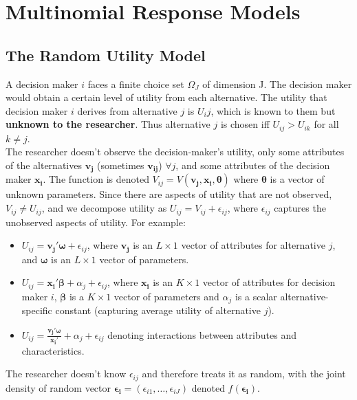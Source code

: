\documentclass[DIV=14,titlepage=false]{scrreprt}
\begin{document}
\vspace{-10pt}
\setcounter{chapter}{2}

\chapter{Multinomial Response Models}

\section{The Random Utility Model}
A decision maker $i$ faces a finite choice set $\Omega_J$ of dimension J. The decision maker would obtain a certain level of utility from each alternative. The utility that decision maker $i$ derives from alternative $j$ is $U_ij$, which is known to them but \textbf{unknown to the researcher}. Thus alternative $j$ is chosen iff $U_{ij} > U_{ik}$ for all $k \neq j$. \\
The researcher doesn't observe the decision-maker's utility, only some attributes of the alternatives $\mathbf{v_j}$ (sometimes $\mathbf{v_{ij}}$) $\forall j$, and some attributes of the decision maker $\mathbf{x_i}$. The function is denoted $V_{ij} = V(\mathbf{v_j},\mathbf{x_i}, \mathbf{\theta})$ where $\mathbf{\theta}$ is a vector of unknown parameters. Since there are aspects of utility that are not observed, $V_{ij} \not = U_{ij}$, and we decompose utility as $U_{ij} = V_{ij} + \epsilon_{ij}$, where $\epsilon_{ij}$ captures the unobserved aspects of utility. For example:
\begin{itemize}
    \item $U_{ij} = \mathbf{v_j'\omega} + \epsilon_{ij}$, where $\mathbf{v_j}$ is an $L\times1$ vector of attributes for alternative $j$, and $\mathbf{\omega}$ is an $L\times1$ vector of parameters.
    \item $U_{ij} = \mathbf{x_i ' \beta} + \alpha_j + \epsilon_{ij}$, where $\mathbf{x_i}$ is an $K\times1$ vector of attributes for decision maker $i$, $\mathbf{\beta}$ is a $K\times1$ vector of parameters and $\alpha_j$ is a scalar alternative-specific constant (capturing average utility of alternative $j$).
    \item $U_{ij} = \frac{\mathbf{v_j'\omega}}{\mathbf{x_i'}} + \alpha_j + \epsilon_{ij}$ denoting interactions between attributes and characteristics.
\end{itemize}
The researcher doesn't know $\epsilon_{ij}$ and therefore treats it as random, with the joint density of random vector $\mathbf{\epsilon_i} = (\epsilon_{i1}, \dots, \epsilon_{iJ})$ denoted $f(\mathbf{\epsilon_i})$. 
\end{document}

